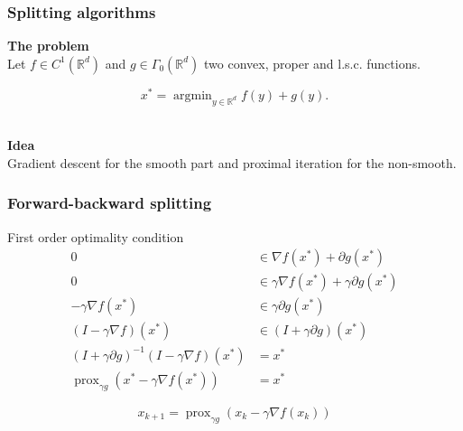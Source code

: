 \documentclass[aspectratio=169]{beamer}
\DeclareMathOperator{\Prox}{prox}
\newcommand{\prox}[2]{\Prox_{#1}\left({#2}\right)}
\newcommand{\rd}{\mathbb{R}^d}
\DeclareMathOperator*{\argmin}{argmin}
\begin{document}
		\begin{frame}
		\frametitle{Splitting algorithms}
		\begin{center}
		\textbf{The problem}
		\quad \\		
		Let $f\in C^1(\rd)$ and $g\in\Gamma_0\left(\rd\right)$ two convex, proper and l.s.c. functions.
		\end{center}
		\begin{equation}
		\nonumber
		x^* = \argmin_{y\in\rd} f(y) + g(y).
		\end{equation}
		\quad \\
		
		\pause
		\begin{center}
		\textbf{Idea}
		\quad \\
		Gradient descent for the smooth part and proximal iteration for the non-smooth.
		\end{center}
		\end{frame}
		
		\begin{frame}
		\frametitle{Forward-backward splitting}
		First order optimality condition
		\begin{align}
		\nonumber 0 &\in \nabla f\left(x^*\right) + \partial g \left(x^*\right)\\
		\nonumber 0 &\in \gamma \nabla f\left(x^*\right) + \gamma \partial g \left(x^*\right)\\
		\nonumber -\gamma\nabla f \left(x^*\right) &\in \gamma\partial g \left(x^*\right)\\
		\nonumber \left(I-\gamma\nabla f\right) \left(x^*\right) &\in \left(I+\gamma\partial g\right) \left(x^*\right)\\
		\nonumber \left(I+\gamma \partial g\right)^{-1} \left(I-\gamma\nabla f\right) \left(x^*\right) &= x^*\\
		\nonumber \prox{\gamma g}{x^* - \gamma\nabla f\left(x^*\right)} &= x^*
		\end{align}
		
		\pause
		
		\begin{equation}
		\nonumber x_{k+1} = \prox{\gamma g}{x_k - \gamma\nabla f\left(x_k\right)}
		\end{equation}
		\end{frame}
		
\end{document}
